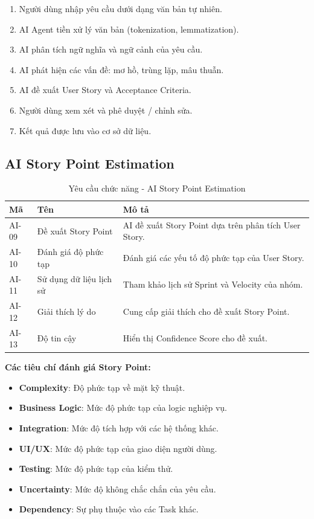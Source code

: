\documentclass[12pt,a4paper]{report}
\begin{document}
\begin{enumerate}
\item Người dùng nhập yêu cầu dưới dạng văn bản tự nhiên.
\item AI Agent tiền xử lý văn bản (tokenization, lemmatization).
\item AI phân tích ngữ nghĩa và ngữ cảnh của yêu cầu.
\item AI phát hiện các vấn đề: mơ hồ, trùng lặp, mâu thuẫn.
\item AI đề xuất User Story và Acceptance Criteria.
\item Người dùng xem xét và phê duyệt / chỉnh sửa.
\item Kết quả được lưu vào cơ sở dữ liệu.
\end{enumerate}

\subsection{AI Story Point Estimation}

\begin{table}[H]
\centering
\caption{Yêu cầu chức năng - AI Story Point Estimation}
\begin{tabular}{|p{2.5cm}|p{3.5cm}|p{8cm}|}
\hline
\textbf{Mã} & \textbf{Tên} & \textbf{Mô tả} \\
\hline
AI-09 & Đề xuất Story Point & AI đề xuất Story Point dựa trên phân tích User Story. \\
\hline
AI-10 & Đánh giá độ phức tạp & Đánh giá các yếu tố độ phức tạp của User Story. \\
\hline
AI-11 & Sử dụng dữ liệu lịch sử & Tham khảo lịch sử Sprint và Velocity của nhóm. \\
\hline
AI-12 & Giải thích lý do & Cung cấp giải thích cho đề xuất Story Point. \\
\hline
AI-13 & Độ tin cậy & Hiển thị Confidence Score cho đề xuất. \\
\hline
\end{tabular}
\label{tab:ai_storypoint_requirements}
\end{table}

\textbf{Các tiêu chí đánh giá Story Point:}

\begin{itemize}
\item \textbf{Complexity}: Độ phức tạp về mặt kỹ thuật.
\item \textbf{Business Logic}: Mức độ phức tạp của logic nghiệp vụ.
\item \textbf{Integration}: Mức độ tích hợp với các hệ thống khác.
\item \textbf{UI/UX}: Mức độ phức tạp của giao diện người dùng.
\item \textbf{Testing}: Mức độ phức tạp của kiểm thử.
\item \textbf{Uncertainty}: Mức độ không chắc chắn của yêu cầu.
\item \textbf{Dependency}: Sự phụ thuộc vào các Task khác.
\end{itemize}
\end{document}
